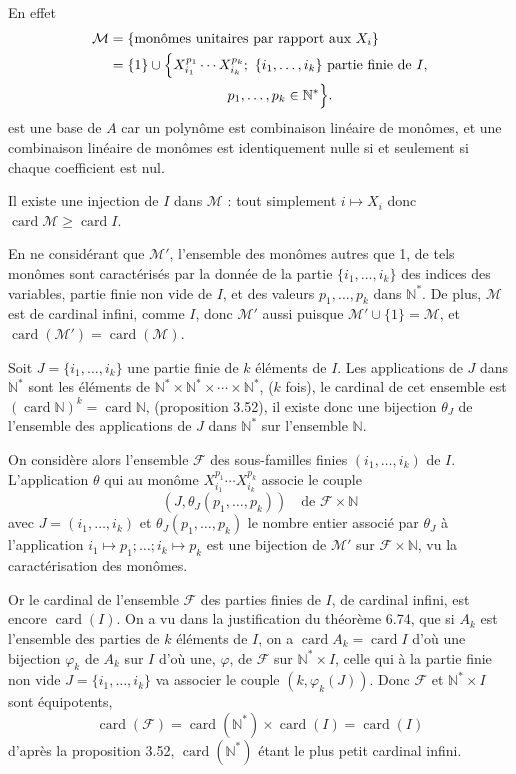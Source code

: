 En effet
\[
\begin{aligned}
\mathcal M&=\{\text{monômes unitaires par rapport aux }X_i\}\\
&=\{1\}\cup\Bigl\{X_{i_1}^{p_1}\cdots X_{i_k}^{p_k};\ \{i_1,\ldots,i_k\}\text{ partie finie de }I,\\
&\hspace{8.5em}p_1,\ldots,p_k\in\mathbb N^*\Bigr\}.
\end{aligned}
\]
est une base de $A$ car un polynôme est combinaison linéaire de monômes, et une combinaison linéaire de monômes est identiquement nulle si et seulement si chaque coefficient est nul.

Il existe une injection de $I$ dans $\mathcal M$ : tout simplement $i\longmapsto X_i$ donc $\operatorname{card}\mathcal M\ge\operatorname{card}I$.

En ne considérant que $\mathcal M'$, l'ensemble des monômes autres que 1, de tels monômes sont caractérisés par la donnée de la partie $\{i_1,\ldots,i_k\}$ des indices des variables, partie finie non vide de $I$, et des valeurs $p_1,\ldots,p_k$ dans $\mathbb N^*$. De plus, $\mathcal M$ est de cardinal infini, comme $I$, donc $\mathcal M'$ aussi puisque $\mathcal M'\cup\{1\}=\mathcal M$, et $\operatorname{card}(\mathcal M')=\operatorname{card}(\mathcal M)$.

Soit $J=\{i_1,\ldots,i_k\}$ une partie finie de $k$ éléments de $I$. Les applications de $J$ dans $\mathbb N^*$ sont les éléments de $\mathbb N^*\times\mathbb N^*\times\cdots\times\mathbb N^*$, ($k$ fois), le cardinal de cet ensemble est $(\operatorname{card}\mathbb N)^k=\operatorname{card}\mathbb N$, (proposition 3.52), il existe donc une bijection $\theta_J$ de l'ensemble des applications de $J$ dans $\mathbb N^*$ sur l'ensemble $\mathbb N$.

On considère alors l'ensemble $\mathcal F$ des sous-familles finies $(i_1,\ldots,i_k)$ de $I$. L'application $\theta$ qui au monôme $X_{i_1}^{p_1}\cdots X_{i_k}^{p_k}$ associe le couple
\[
(J,\theta_J(p_1,\ldots,p_k))\quad\text{de }\mathcal F\times\mathbb N
\]
avec $J=(i_1,\ldots,i_k)$ et $\theta_J(p_1,\ldots,p_k)$ le nombre entier associé par $\theta_J$ à l'application $i_1\mapsto p_1;\ldots;i_k\mapsto p_k$ est une bijection de $\mathcal M'$ sur $\mathcal F\times\mathbb N$, vu la caractérisation des monômes.

Or le cardinal de l'ensemble $\mathcal F$ des parties finies de $I$, de cardinal infini, est encore $\operatorname{card}(I)$. On a vu dans la justification du théorème 6.74, que si $A_k$ est l'ensemble des parties de $k$ éléments de $I$, on a $\operatorname{card}A_k=\operatorname{card}I$ d'où une bijection $\varphi_k$ de $A_k$ sur $I$ d'où une, $\varphi$, de $\mathcal F$ sur $\mathbb N^*\times I$, celle qui à la partie finie non vide $J=\{i_1,\ldots,i_k\}$ va associer le couple $(k,\varphi_k(J))$. Donc $\mathcal F$ et $\mathbb N^*\times I$ sont équipotents,
\[
\operatorname{card}(\mathcal F)=\operatorname{card}(\mathbb N^*)\times\operatorname{card}(I)=\operatorname{card}(I)
\]
d'après la proposition 3.52, $\operatorname{card}(\mathbb N^*)$ étant le plus petit cardinal infini.

